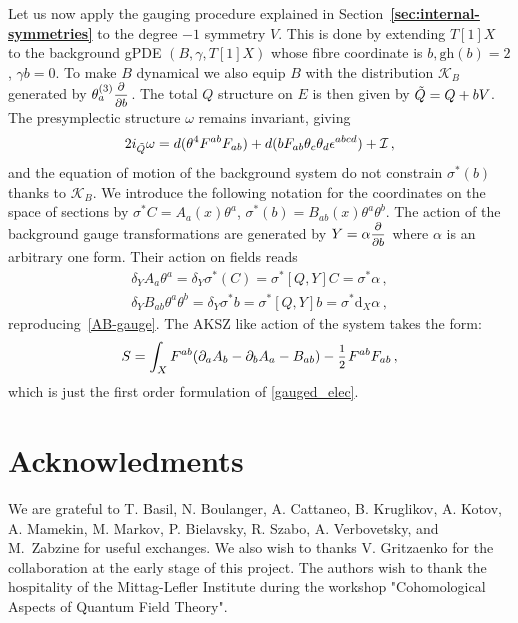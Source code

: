 \documentclass[a4paper,12pt]{article}
\numberwithin{equation}{section} %
\newcommand{\bref}[1]{\textbf{\ref{#1}}}
\newcommand{\gh}[1]{\mathrm{gh}(#1)}
\newcommand{\dx}{\mathrm{d}_X}
\renewcommand{\d}{\partial}
\newcommand{\half}{\mathchoice{%
    \ffrac{1}{2}}{\frac{1}{2}}{\frac{1}{2}}{\frac{1}{2}}}
\newcommand{\ffrac}[2]{\raisebox{.5pt}%
  {\footnotesize$\displaystyle\frac{#1}{#2}$}\kern1pt}
\newcommand{\ddl}[2]{\ffrac{\d #1}{\d #2}}
\def\cI{\mathcal{I}}
\def\cK{\mathcal{K}}
\begin{document}
Let us now apply the gauging procedure explained in Section~\bref{sec:internal-symmetries} to the degree $-1$ symmetry $V$. This is done by extending $T[1]X$ to the background gPDE $(B,\gamma,T[1]X)$ whose fibre coordinate is $b, \gh{b} = 2$, $\gamma b = 0$. To make $B$ dynamical we also equip $B$ with the distribution $\cK_B$ generated by ${\theta^{(3)}_a}\ddl{}{b}$. The total $Q$ structure on $E$ is then given by $\Tilde{Q} = Q + bV$. The presymplectic structure $\omega$ remains invariant, giving 
\begin{equation}
    2i_{\Tilde{Q}}\omega = d( \theta^4 F^{ab}F_{ab}) +  d( bF_{ab}\theta_c\theta_d\epsilon^{abcd}) + \cI\,,
\end{equation}
and the equation of motion of the background system do not constrain $\sigma^*(b)$  thanks to $\cK_B$. We introduce the following notation for the coordinates on the space of sections by $\sigma^*C = A_a(x)\theta^a$, $\sigma^*(b) = B_{ab}(x)\theta^a \theta^b $. The action of the background gauge transformations are generated by $Y = \alpha\ddl{}{b}$ where $\alpha$ is an arbitrary one form. Their action on fields reads
\begin{equation}
\begin{gathered}
    \delta_Y A_a \theta^a = \delta_Y\sigma^*(C) = \sigma^*[Q,Y] C = \sigma^*\alpha \,,\\
    \delta_Y B_{ab}\theta^a \theta^b = \delta_Y \sigma^*b = \sigma^*[Q,Y] b = \sigma^* \dx\alpha\,,
\end{gathered}
\end{equation}
reproducing~\eqref{AB-gauge}. The AKSZ like action of the system takes the form:
\begin{equation}
    S = \int_X F^{ab}(\partial_a A_b - \partial_b A_a    -  B_{ab})  - \half F^{ab}F_{ab}\,,
\end{equation}
which is just the first order formulation of \eqref{gauged_elec}.



\section*{Acknowledments}
We are grateful to T. Basil, N. Boulanger, A. Cattaneo, B. Kruglikov, A. Kotov, A. Mamekin, M. Markov, P. Bielavsky, R. Szabo, A. Verbovetsky, and M.~Zabzine for useful exchanges. We also wish to thanks V. Gritzaenko for the collaboration at the early stage of this project.
The authors wish to thank the hospitality of the Mittag-Lefler Institute during the workshop "Cohomological Aspects of Quantum Field Theory".
\end{document}
